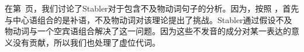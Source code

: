 \noindent
在第~\pageref{Beispiel-leeres-Element-intransitive-Verben}页，我们讨论了Stabler对于包含不及物动词句子的分析。因为，按照 \citet[]{Chomsky2008a}，首先与中心语组合的是补语，不及物动词对该理论提出了挑战。Stabler通过假设不及物动词与一个空宾语组合解决了这一问题\citep[,124]{Veenstra98a}。因为这些不发音的成分对某一表达的意义没有贡献，所以我们也处理了虚位代词。

